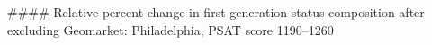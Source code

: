 #### Relative percent change in first-generation status composition after excluding Geomarket: Philadelphia, PSAT score 1190–1260
